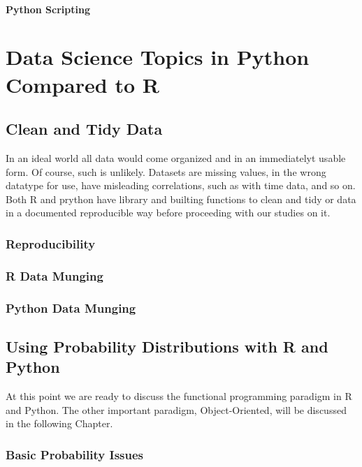 \documentclass[]{book}
\theoremstyle{definition}
\theoremstyle{definition}
\theoremstyle{definition}
\theoremstyle{remark}
\begin{document}
\subsection{Python Scripting}\label{python-scripting-4}

\part{Data Science Topics in Python Compared to
R}\label{part-data-science-topics-in-python-compared-to-r}

\chapter{Clean and Tidy Data}\label{clean-and-tidy-data}

In an ideal world all data would come organized and in an immediatelyt
usable form. Of course, such is unlikely. Datasets are missing values,
in the wrong datatype for use, have misleading correlations, such as
with time data, and so on. Both R and prython have library and builting
functions to clean and tidy or data in a documented reproducible way
before proceeding with our studies on it.

\section{Reproducibility}\label{reproducibility}

\section{R Data Munging}\label{r-data-munging}

\section{Python Data Munging}\label{python-data-munging}

\chapter{Using Probability Distributions with R and
Python}\label{using-probability-distributions-with-r-and-python}

At this point we are ready to discuss the functional programming
paradigm in R and Python. The other important paradigm, Object-Oriented,
will be discussed in the following Chapter.

\section{Basic Probability Issues}\label{basic-probability-issues}
\end{document}
